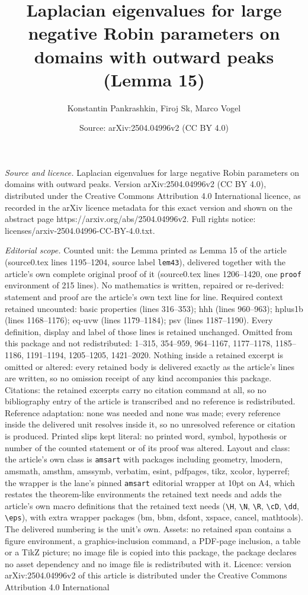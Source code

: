 \documentclass[10pt,a4paper]{amsart}
\title[Laplacian eigenvalues for large negative Robin parameters on]{Laplacian eigenvalues for large negative Robin parameters on domains with outward peaks (Lemma 15)}
\author{Konstantin Pankrashkin, Firoj Sk, Marco Vogel}
\date{Source: arXiv:2504.04996v2 (CC BY 4.0)}
\begin{document}
\maketitle

\noindent\emph{Source and licence.} Laplacian eigenvalues for large negative Robin parameters on domains with outward peaks. Version arXiv:2504.04996v2 (CC BY 4.0), distributed under the Creative Commons Attribution 4.0 International licence, as recorded in the arXiv licence metadata for this exact version and shown on the abstract page https://arxiv.org/abs/2504.04996v2. Full rights notice: licenses/arxiv-2504.04996-CC-BY-4.0.txt.\par\smallskip

\noindent\textit{Editorial scope.} Counted unit: the Lemma printed as Lemma 15 of the article (source0.tex lines 1195--1204, source label \texttt{lem43}), delivered together with the article's own complete original proof of it (source0.tex lines 1206--1420, one \texttt{proof} environment of 215 lines). No mathematics is written, repaired or re-derived: statement and proof are the article's own text line for line. Required context retained uncounted: basic properties (lines 316--353); hhh (lines 960--963); hplus1b (lines 1168--1176); eq-uvw (lines 1179--1184); psv (lines 1187--1190). Every definition, display and label of those lines is retained unchanged. Omitted from this package and not redistributed: 1--315, 354--959, 964--1167, 1177--1178, 1185--1186, 1191--1194, 1205--1205, 1421--2020. Nothing inside a retained excerpt is omitted or altered: every retained body is delivered exactly as the article's lines are written, so no omission receipt of any kind accompanies this package. Citations: the retained excerpts carry no citation command at all, so no bibliography entry of the article is transcribed and no reference is redistributed. Reference adaptation: none was needed and none was made; every reference inside the delivered unit resolves inside it, so no unresolved reference or citation is produced. Printed slips kept literal: no printed word, symbol, hypothesis or number of the counted statement or of its proof was altered. Layout and class: the article's own class is \texttt{amsart} with packages including geometry, lmodern, amsmath, amsthm, amssymb, verbatim, esint, pdfpages, tikz, xcolor, hyperref; the wrapper is the lane's pinned \texttt{amsart} editorial wrapper at 10pt on A4, which restates the theorem-like environments the retained text needs and adds the article's own macro definitions that the retained text needs (\texttt{\textbackslash H}, \texttt{\textbackslash N}, \texttt{\textbackslash R}, \texttt{\textbackslash cD}, \texttt{\textbackslash dd}, \texttt{\textbackslash eps}), with extra wrapper packages (bm, bbm, dsfont, xspace, cancel, mathtools). The delivered numbering is the unit's own. Assets: no retained span contains a figure environment, a graphics-inclusion command, a PDF-page inclusion, a table or a TikZ picture; no image file is copied into this package, the package declares no asset dependency and no image file is redistributed with it. Licence: version arXiv:2504.04996v2 of this article is distributed under the Creative Commons Attribution 4.0 International 
\end{document}
